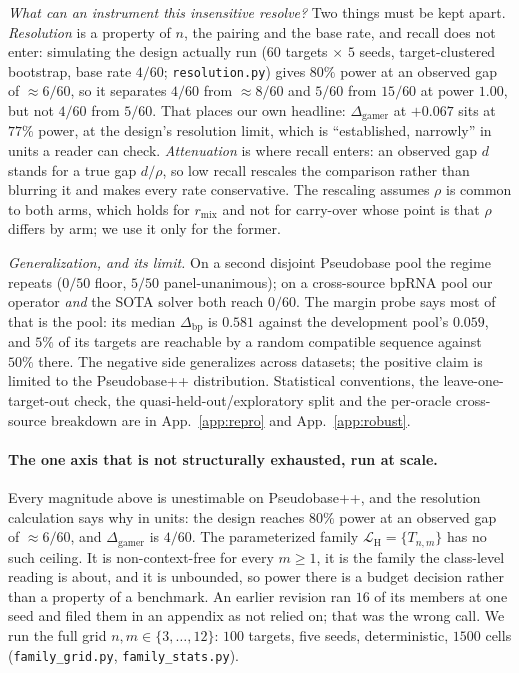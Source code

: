 \documentclass[11pt]{article}
\begin{document}
\emph{What can an instrument this insensitive resolve?} Two things must be kept apart. \emph{Resolution} is a
property of $n$, the pairing and the base rate, and recall does not enter: simulating the design actually run
($60$ targets $\times$ $5$ seeds, target-clustered bootstrap, base rate $4/60$; \texttt{resolution.py}) gives
$80\%$ power at an observed gap of $\approx\!6/60$, so it separates $4/60$ from $\approx\!8/60$ and $5/60$ from
$15/60$ at power $1.00$, but not $4/60$ from $5/60$. That places our own headline: $\Delta_{\mathrm{gamer}}$ at
${+}0.067$ sits at $77\%$ power, at the design's resolution limit, which is ``established, narrowly'' in units
a reader can check. \emph{Attenuation} is where recall enters: an observed gap $d$ stands for a true gap
$d/\rho$, so low recall rescales the comparison rather than blurring it and makes every rate conservative. The
rescaling assumes $\rho$ is common to both arms, which holds for $r_{\mathrm{mix}}$ and not for carry-over
whose point is that $\rho$ differs by arm; we use it only for the former.

\emph{Generalization, and its limit.} On a second disjoint Pseudobase pool the regime repeats ($0/50$ floor,
$5/50$ panel-unanimous); on a cross-source bpRNA pool our operator \emph{and} the SOTA solver both reach
$0/60$. The margin probe says most of that is the pool: its median $\Delta_{\mathrm{bp}}$ is $0.581$ against
the development pool's $0.059$, and $5\%$ of its targets are reachable by a random compatible sequence against
$50\%$ there. The negative side generalizes across datasets; the positive claim is limited to the Pseudobase++
distribution. Statistical conventions, the leave-one-target-out check, the quasi-held-out/exploratory split and
the per-oracle cross-source breakdown are in App.~\ref{app:repro} and App.~\ref{app:robust}.

\paragraph{The one axis that is not structurally exhausted, run at scale.} Every magnitude above is
unestimable on Pseudobase++, and the resolution calculation says why in units: the design reaches $80\%$ power
at an observed gap of $\approx\!6/60$, and $\Delta_{\mathrm{gamer}}$ is $4/60$. The parameterized family
$\mathcal L_{\mathrm H}=\{T_{n,m}\}$ has no such ceiling. It is non-context-free for every $m\ge1$, it is the
family the class-level reading is about, and it is unbounded, so power there is a budget decision rather than a
property of a benchmark. An earlier revision ran $16$ of its members at one seed and filed them in an appendix
as not relied on; that was the wrong call. We run the full grid $n,m\in\{3,\dots,12\}$: $100$ targets, five
seeds, deterministic, $1500$ cells (\texttt{family\_grid.py}, \texttt{family\_stats.py}).
\end{document}
